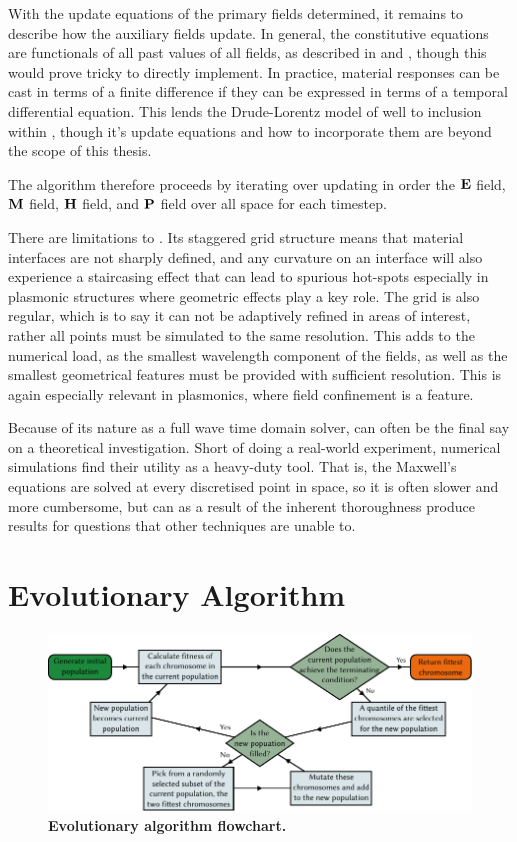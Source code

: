 With the update equations of the primary fields determined, it remains to
describe how the auxiliary fields update.
In general, the constitutive equations are functionals of all past values of all
fields, as described in  and , though this would
prove tricky to directly implement.
In practice, material responses can be cast in terms of a finite difference if
they can be expressed in terms of a temporal differential equation.
This lends the Drude-Lorentz model of  well to inclusion
within \fdtd, though it's update equations and how to incorporate them are
beyond the scope of this thesis.

The \fdtd algorithm therefore proceeds by iterating over updating in order the
$\E$ field, $\M$ field, $\H$ field, and $\P$ field over all space for each
timestep.

There are limitations to \fdtd.
Its staggered grid structure means that material interfaces are not sharply
defined, and any curvature on an interface will also experience a staircasing
effect that can lead to spurious hot-spots especially in plasmonic structures
where geometric effects play a key role.
The grid is also regular, which is to say it can not be adaptively refined in
areas of interest, rather all points must be simulated to the same resolution.
This adds to the numerical load, as the smallest wavelength component of the
fields, as well as the smallest geometrical features must be provided with
sufficient resolution.
This is again especially relevant in plasmonics, where field confinement is a
feature.

Because of its nature as a full wave time domain solver, \fdtd can often be the
final say on a theoretical investigation.
Short of doing a real-world experiment, \fdtd numerical simulations find their
utility as a heavy-duty tool.
That is, the Maxwell's equations are solved at every discretised point in space,
so it is often slower and more cumbersome, but can as a result of the inherent
thoroughness produce results for questions that other techniques are unable to.

\section{Evolutionary Algorithm} \label{sec:EA}

\begin{figure}
 \includegraphics{figs/mt/Flow.pdf}
 \caption[Evolutionary algorithm flowchart]{\small \label{fig:flow}
 \textbf{Evolutionary algorithm flowchart.}
 }
\end{figure}

